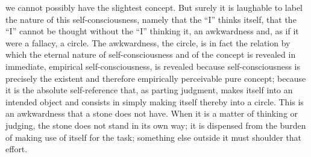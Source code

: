 we cannot possibly have the slightest concept.
But surely it is laughable to label
the nature of this self-consciousness,
namely that the “I” thinks itself,
that the “I” cannot be thought without the “I” thinking it,
an awkwardness and, as if it were a fallacy, a circle.
The awkwardness, the circle, is in fact the relation
by which the eternal nature of self-consciousness
and of the concept is revealed in
immediate, empirical self-consciousness,
is revealed because self-consciousness is
precisely the existent and therefore
empirically perceivable pure concept;
because it is the absolute self-reference that,
as parting judgment, makes itself into an intended object
and consists in simply making itself thereby into a circle.
This is an awkwardness that a stone does not have.
When it is a matter of thinking or judging,
the stone does not stand in its own way;
it is dispensed from the burden of making
use of itself for the task;
something else outside it must shoulder that effort.

